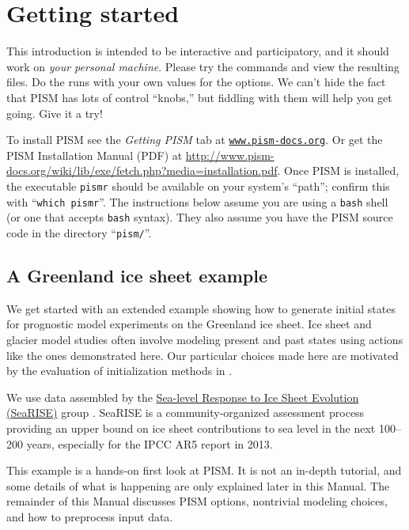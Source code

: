 \section{Getting started}\label{sec:start}

This introduction is intended to be interactive and participatory, and it should work on \emph{your personal machine}.  Please try the commands and view the resulting files.  Do the runs with your own values for the options.  We can't hide the fact that PISM has lots of control ``knobs,'' but fiddling with them will help you get going.  Give it a try!

To install PISM see the \emph{Getting PISM} tab at \href{http://www.pism-docs.org}{\texttt{www.pism-docs.org}}.  Or get the PISM Installation Manual (PDF) at \url{http://www.pism-docs.org/wiki/lib/exe/fetch.php?media=installation.pdf}.  Once PISM is installed, the executable \texttt{pismr} should be available on your system's ``path''; confirm this with ``\texttt{which pismr}''.  The instructions below assume you are using a \texttt{bash} shell (or one that accepts \texttt{bash} syntax).  They also assume you have the PISM source code in the directory ``\texttt{pism/}''.

\subsection{A Greenland ice sheet example}

We get started with an extended example showing how to generate initial states for prognostic model experiments on the Greenland ice sheet.  Ice sheet and glacier model studies often involve modeling present and past states using actions like the ones demonstrated here.  Our particular choices made here are motivated by the evaluation of initialization methods in \cite{AschwandenAdalgeirsdottirKhroulev}.

We use data assembled by the \href{http://websrv.cs.umt.edu/isis/index.php/SeaRISE_Assessment}{Sea-level Response to Ice Sheet Evolution (SeaRISE)} group \cite{Bindschadler2013SeaRISE}.  SeaRISE is a community-organized assessment process providing an upper bound on ice sheet contributions to sea level in the next 100--200 years, especially for the IPCC AR5 report in 2013.

This example is a hands-on first look at PISM.  It is not an in-depth tutorial, and some details of what is happening are only explained later in this Manual.  The remainder of this Manual discusses PISM options, nontrivial modeling choices, and how to preprocess input data.

